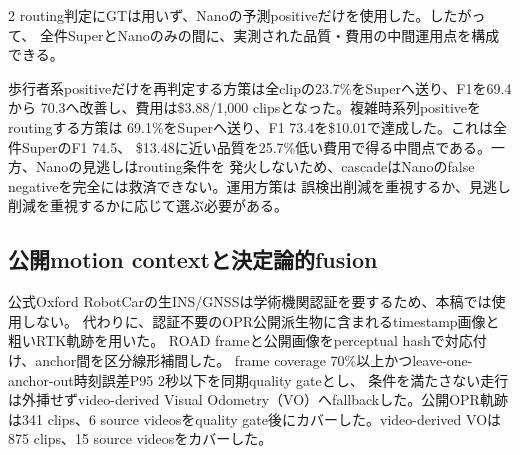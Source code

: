 \documentclass[9pt,a4paper]{extarticle}
\begin{document}
\begin{multicols}{2}
routing判定にGTは用いず、Nanoの予測positiveだけを使用した。したがって、
全件SuperとNanoのみの間に、実測された品質・費用の中間運用点を構成できる。

歩行者系positiveだけを再判定する方策は全clipの23.7\%をSuperへ送り、F1を69.4から
70.3へ改善し、費用は\$3.88/1,000 clipsとなった。複雑時系列positiveをroutingする方策は
69.1\%をSuperへ送り、F1 73.4を\$10.01で達成した。これは全件SuperのF1 74.5、
\$13.48に近い品質を25.7\%低い費用で得る中間点である。一方、Nanoの見逃しはrouting条件を
発火しないため、cascadeはNanoのfalse negativeを完全には救済できない。運用方策は
誤検出削減を重視するか、見逃し削減を重視するかに応じて選ぶ必要がある。

\subsection{公開motion contextと決定論的fusion}
公式Oxford RobotCarの生INS/GNSSは学術機関認証を要するため、本稿では使用しない。
代わりに、認証不要のOPR公開派生物\cite{oprproject2026}に含まれるtimestamp画像と
粗いRTK軌跡を用いた。
ROAD frameと公開画像をperceptual hashで対応付け、anchor間を区分線形補間した。
frame coverage 70\%以上かつleave-one-anchor-out時刻誤差P95 2秒以下を同期quality gateとし、
条件を満たさない走行は外挿せずvideo-derived Visual Odometry（VO）へfallbackした。公開OPR軌跡は341 clips、6 source videosをquality gate後にカバーした。video-derived VOは875 clips、15 source videosをカバーした。


\end{multicols}
\end{document}
